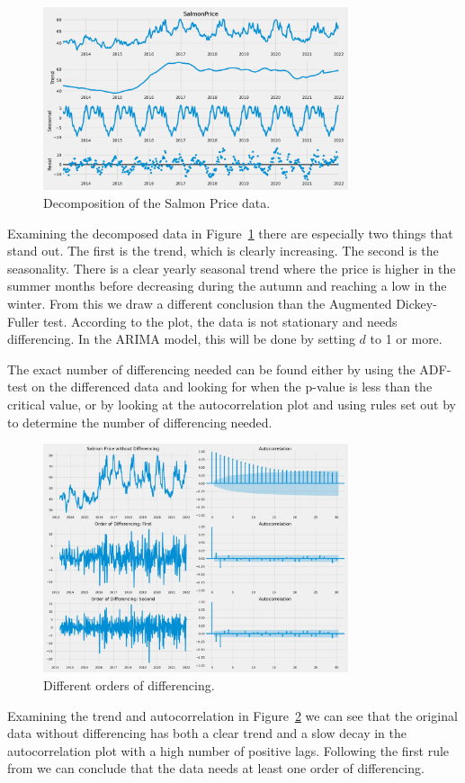 \begin{figure}[H]
    \centering
    \includegraphics[width=0.8\textwidth]{data/Figures/ARIMA/Decomposition.png}
    \caption[Decomposition of the Salmon Price data]{Decomposition of the Salmon Price data.}\label{fig:Decomposition}
\end{figure}
Examining the decomposed data in Figure~\ref{fig:Decomposition} there are especially two things that stand out. The first is the trend, which is clearly increasing. The second is the seasonality. There is a clear yearly seasonal trend where the price is higher in the summer months before decreasing during the autumn and reaching a low in the winter. From this we draw a different conclusion than the Augmented Dickey-Fuller test. According to the plot, the data is not stationary and needs differencing. In the ARIMA model, this will be done by setting $d$ to 1 or more. 

The exact number of differencing needed can be found either by using the ADF-test on the differenced data and looking for when the p-value is less than the critical value, or by looking at the autocorrelation plot and using rules set out by \textcite{nau_2019} to determine the number of differencing needed. 
\begin{figure}[H]
    \centering
    \includegraphics[width=0.8\textwidth]{data/Figures/ARIMA/Diff1_ACF_30.png}
    \caption[Different orders of differencing]{Different orders of differencing.}\label{fig:ACF_Differencing}
\end{figure}
Examining the trend and autocorrelation in Figure~\ref{fig:ACF_Differencing} we can see that the original data without differencing has both a clear trend and a slow decay in the autocorrelation plot with a high number of positive lags. Following the first rule from \textcite{nau_2019} we can conclude that the data needs at least one order of differencing.

